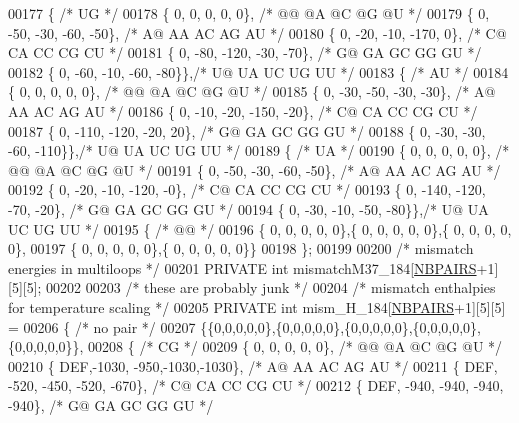 \begin{DoxyCode}
00177   \{ \textcolor{comment}{/* UG */}
00178    \{   0,    0,    0,    0,    0\}, \textcolor{comment}{/* @@  @A  @C  @G  @U */}
00179    \{   0,  -50,  -30,  -60,  -50\}, \textcolor{comment}{/* A@  AA  AC  AG  AU */}
00180    \{   0,  -20,  -10, -170,    0\}, \textcolor{comment}{/* C@  CA  CC  CG  CU */}
00181    \{   0,  -80, -120,  -30,  -70\}, \textcolor{comment}{/* G@  GA  GC  GG  GU */}
00182    \{   0,  -60,  -10,  -60,  -80\}\},\textcolor{comment}{/* U@  UA  UC  UG  UU */}
00183   \{ \textcolor{comment}{/* AU */}
00184    \{   0,    0,    0,    0,    0\}, \textcolor{comment}{/* @@  @A  @C  @G  @U */}
00185    \{   0,  -30,  -50,  -30,  -30\}, \textcolor{comment}{/* A@  AA  AC  AG  AU */}
00186    \{   0,  -10,  -20, -150,  -20\}, \textcolor{comment}{/* C@  CA  CC  CG  CU */}
00187    \{   0, -110, -120,  -20,   20\}, \textcolor{comment}{/* G@  GA  GC  GG  GU */}
00188    \{   0,  -30,  -30,  -60, -110\}\},\textcolor{comment}{/* U@  UA  UC  UG  UU */}
00189   \{ \textcolor{comment}{/* UA */}
00190    \{   0,    0,    0,    0,    0\}, \textcolor{comment}{/* @@  @A  @C  @G  @U */}
00191    \{   0,  -50,  -30,  -60,  -50\}, \textcolor{comment}{/* A@  AA  AC  AG  AU */}
00192    \{   0,  -20,  -10, -120,   -0\}, \textcolor{comment}{/* C@  CA  CC  CG  CU */}
00193    \{   0, -140, -120,  -70,  -20\}, \textcolor{comment}{/* G@  GA  GC  GG  GU */}
00194    \{   0,  -30,  -10,  -50,  -80\}\},\textcolor{comment}{/* U@  UA  UC  UG  UU */}
00195   \{ \textcolor{comment}{/* @@ */}
00196    \{  0,  0,  0,  0,  0\},\{  0,  0,  0,  0,  0\},\{  0,  0,  0,  0,  0\},
00197    \{  0,  0,  0,  0,  0\},\{  0,  0,  0,  0,  0\}\}
00198 \};
00199 
00200 \textcolor{comment}{/* mismatch energies in multiloops */}
00201 PRIVATE \textcolor{keywordtype}{int} mismatchM37\_184[\hyperlink{energy__const_8h_a5e75221c779d618eab81e096f37e32ce}{NBPAIRS}+1][5][5];
00202 
00203 \textcolor{comment}{/* these are probably junk */}
00204 \textcolor{comment}{/* mismatch enthalpies for temperature scaling */}
00205 PRIVATE \textcolor{keywordtype}{int} mism\_H\_184[\hyperlink{energy__const_8h_a5e75221c779d618eab81e096f37e32ce}{NBPAIRS}+1][5][5] =
00206 \{ \textcolor{comment}{/* no pair */}
00207   \{\{0,0,0,0,0\},\{0,0,0,0,0\},\{0,0,0,0,0\},\{0,0,0,0,0\},\{0,0,0,0,0\}\},
00208   \{ \textcolor{comment}{/* CG */}
00209    \{   0,    0,    0,    0,    0\}, \textcolor{comment}{/* @@  @A  @C  @G  @U */}
00210    \{ DEF,-1030, -950,-1030,-1030\}, \textcolor{comment}{/* A@  AA  AC  AG  AU */}
00211    \{ DEF, -520, -450, -520, -670\}, \textcolor{comment}{/* C@  CA  CC  CG  CU */}
00212    \{ DEF, -940, -940, -940, -940\}, \textcolor{comment}{/* G@  GA  GC  GG  GU */}

\end{DoxyCode}
